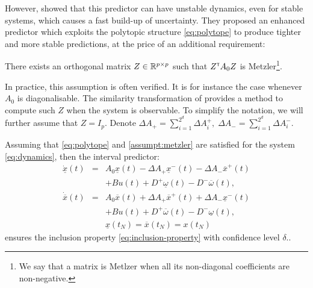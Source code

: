 \documentclass{article}
\begin{document}
However, \citet{leurent2019interval} showed that this predictor can have unstable dynamics, even for stable systems, which causes a fast build-up of uncertainty. They proposed an enhanced predictor which exploits the polytopic structure \eqref{eq:polytope} to produce tighter and more stable predictions, at the price of an additional requirement:

\begin{assumption}
\label{assumpt:metzler}
There exists an orthogonal matrix $Z\in\mathbb{R}^{p\times p}$ such that $Z^{\mathsf{\scriptscriptstyle T}} A_0 Z$ is Metzler\footnote{We say that a matrix is Metlzer when all its non-diagonal coefficients are non-negative.}.
\end{assumption}
In practice, this assumption is often verified. It is for instance the case whenever $A_0$ is diagonalisable. The similarity transformation of \citep{Efimov2013} provides a method to compute such $Z$ when the system is observable. To simplify the notation, we will further assume that $Z = I_p$. Denote $
\Delta A_{+}=\sum_{i=1}^{2^d}\Delta A_{i}^{+},\;\Delta A_{-}=\sum_{i=1}^{2^d}\Delta A_{i}^{-}$.

\begin{proposition}
\label{prop:predictor}
Assuming that \eqref{eq:polytope} and \autoref{assumpt:metzler} are satisfied for the system \eqref{eq:dynamics}, then the interval predictor:
\begin{eqnarray}
\dot{\underline{x}}(t) & = & A_{0}\underline{x}(t)-\Delta A_{+}\underline{x}^{-}(t)-\Delta A_{-}\overline{x}^{+}(t)\nonumber \\
 &  & +Bu(t)+D^{+}\underline{\omega}(t)-D^{-}\overline{\omega}(t),\nonumber\\
\dot{\overline{x}}(t) & = & A_{0}\overline{x}(t)+\Delta A_{+}\overline{x}^{+}(t)+\Delta A_{-}\underline{x}^{-}(t) \label{eq:interval-predictor} \\
 &  & +Bu(t)+D^{+}\overline{\omega}(t)-D^{-}\underline{\omega}(t),\nonumber \\
 &  & \underline{x}(t_N)=\overline{x}(t_N)={x}(t_N)\nonumber 
\end{eqnarray}
ensures the inclusion property \eqref{eq:inclusion-property} with confidence level $\delta$..
\end{proposition}
\end{document}
